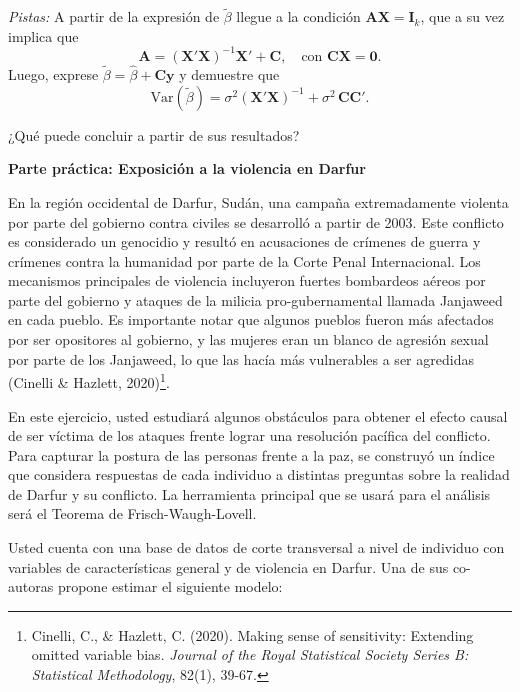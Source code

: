 \documentclass[a4paper, answers, addpoints, 11pt]{exam}
\begin{document}
\begin{enumerate}
\begin{itemize}
\textit{Pistas:} A partir de la expresión de $\tilde{\beta}$ llegue a la condición \(\mathbf{A}\mathbf{X} = \mathbf{I}_k\), que a su vez implica que
\[
\mathbf{A} = (\mathbf{X}'\mathbf{X})^{-1}\mathbf{X}' + \mathbf{C}, \quad \text{con } \mathbf{C}\mathbf{X} = \mathbf{0}.
\]
Luego, exprese \(\tilde{\beta} = \hat{\beta} + \mathbf{C}\mathbf{y}\) y demuestre que
\[
\mathrm{Var}(\tilde{\beta}) = \sigma^2 (\mathbf{X}'\mathbf{X})^{-1} + \sigma^2\,\mathbf{C}\mathbf{C}'.
\] 

¿Qué puede concluir a partir de sus resultados?

\end{itemize}
    \end{enumerate}

    \bigskip

\Large\textbf{Parte práctica: Exposición a la violencia en Darfur}

\normalsize\bigskip En la región occidental de Darfur, Sudán, una campaña extremadamente violenta por parte del gobierno contra civiles se desarrolló a partir de 2003. Este conflicto es considerado un genocidio y resultó en acusaciones de crímenes de guerra y crímenes contra la humanidad por parte de la Corte Penal Internacional. Los mecanismos principales de violencia incluyeron fuertes bombardeos aéreos por parte del gobierno y ataques de la milicia pro-gubernamental llamada Janjaweed en cada pueblo. Es importante notar que algunos pueblos fueron más afectados por ser opositores al gobierno, y las mujeres eran un blanco de agresión sexual por parte de los Janjaweed, lo que las hacía más vulnerables a ser agredidas (Cinelli \& Hazlett, 2020)\footnote{Cinelli, C., \& Hazlett, C. (2020). Making sense of sensitivity: Extending omitted variable bias. \textit{Journal of the Royal Statistical Society Series B: Statistical Methodology}, 82(1), 39-67.
}.

\bigskip En este ejercicio, usted estudiará algunos obstáculos para obtener el efecto causal de ser víctima de los ataques frente lograr una resolución pacífica del conflicto. Para capturar la postura de las personas frente a la paz, se construyó un índice que considera respuestas de cada individuo a distintas preguntas sobre la realidad de Darfur y su conflicto. La herramienta principal que se usará para el análisis será el Teorema de Frisch-Waugh-Lovell.

Usted cuenta con una base de datos de corte transversal a nivel de individuo con variables de características general y de violencia en Darfur. Una de sus co-autoras propone estimar el siguiente modelo:
\end{document}
